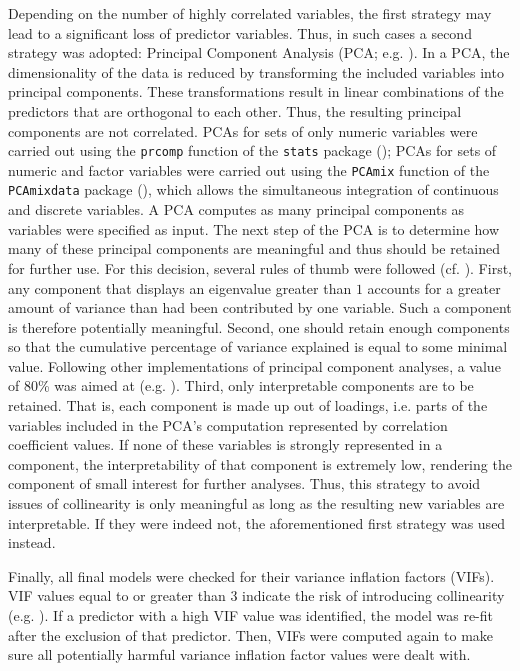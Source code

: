 Depending on the number of highly correlated variables, the first strategy may lead to a significant loss of predictor variables. Thus, in such cases a second strategy was adopted: Principal Component Analysis (PCA; e.g. \cite{Venables2002, Baayen2008, Tomaschek2018collin}). In a PCA, the dimensionality of the data is reduced by transforming the included variables into principal components. These transformations result in linear combinations of the predictors that are orthogonal to each other. Thus, the resulting principal components are not correlated. PCAs for sets of only numeric variables were carried out using the \texttt{prcomp} function of the \texttt{stats} package (\cite{RCore2020}); PCAs for sets of numeric and factor variables were carried out using the \texttt{PCAmix} function of the \texttt{PCAmixdata} package (\cite{Chavent2017}), which allows the simultaneous integration of continuous and discrete variables. A PCA computes as many principal components as variables were specified as input. The next step of the PCA is to determine how many of these principal components are meaningful and thus should be retained for further use. For this decision, several rules of thumb were followed (cf. \cite{ORourke2005, Baayen2008}). First, any component that displays an eigenvalue greater than $1$ accounts for a greater amount of variance than had been contributed by one variable. Such a component is therefore potentially meaningful. Second, one should retain enough components so that the cumulative percentage of variance explained is equal to some minimal value. Following other implementations of principal component analyses, a value of 80\% was aimed at (e.g. \cite{ORourke2005}). Third, only interpretable components are to be retained. That is, each component is made up out of loadings, i.e. parts of the variables included in the PCA’s computation represented by correlation coefficient values. If none of these variables is strongly represented in a component, the interpretability of that component is extremely low, rendering the component of small interest for further analyses. Thus, this strategy to avoid issues of collinearity is only meaningful as long as the resulting new variables are interpretable. If they were indeed not, the aforementioned first strategy was used instead.

Finally, all final models were checked for their variance inflation factors (VIFs). VIF values equal to or greater than $3$ indicate the risk of introducing collinearity (e.g. \cite{Zuur2010}). If a predictor with a high VIF value was identified, the model was re-fit after the exclusion of that predictor. Then, VIFs were computed again to make sure all potentially harmful variance inflation factor values were dealt with. 

